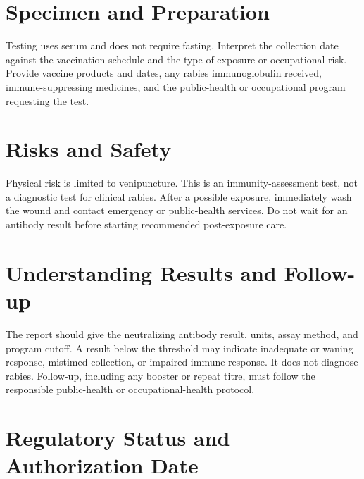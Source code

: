 \section*{Specimen and Preparation}
Testing uses serum and does not require fasting. Interpret the collection date against the vaccination schedule and the type of exposure or occupational risk. Provide vaccine products and dates, any rabies immunoglobulin received, immune-suppressing medicines, and the public-health or occupational program requesting the test.

\section*{Risks and Safety}
Physical risk is limited to venipuncture. This is an immunity-assessment test, not a diagnostic test for clinical rabies. After a possible exposure, immediately wash the wound and contact emergency or public-health services. Do not wait for an antibody result before starting recommended post-exposure care.

\section*{Understanding Results and Follow-up}
The report should give the neutralizing antibody result, units, assay method, and program cutoff. A result below the threshold may indicate inadequate or waning response, mistimed collection, or impaired immune response. It does not diagnose rabies. Follow-up, including any booster or repeat titre, must follow the responsible public-health or occupational-health protocol.

\section*{Regulatory Status and Authorization Date}

\clearpage
